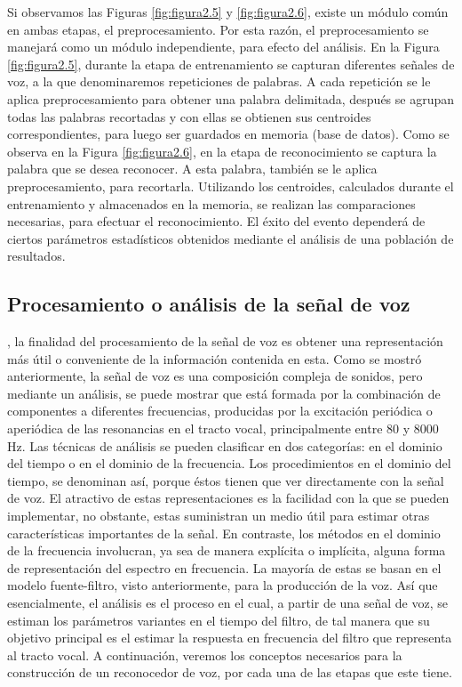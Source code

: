 Si observamos las Figuras \ref{fig:figura2.5} y \ref{fig:figura2.6}, existe un módulo común en ambas etapas, el preprocesamiento. Por esta razón, el preprocesamiento se manejará como un módulo independiente, para efecto del análisis.
\vskip 0.5cm
En la Figura \ref{fig:figura2.5}, durante la etapa de entrenamiento se capturan diferentes señales de voz, a la que denominaremos repeticiones de palabras. A cada repetición se le aplica preprocesamiento para obtener una palabra delimitada, después se agrupan todas las palabras recortadas y con ellas se obtienen sus centroides correspondientes, para luego ser guardados en memoria (base de datos).
\vskip 0.5cm
Como se observa en la Figura \ref{fig:figura2.6}, en la etapa de reconocimiento se captura la palabra que se desea reconocer. A esta palabra, también se le aplica preprocesamiento, para recortarla. Utilizando los centroides, calculados durante el entrenamiento y almacenados en la memoria, se realizan las comparaciones necesarias, para efectuar el reconocimiento. El éxito del evento dependerá de ciertos parámetros estadísticos obtenidos mediante el análisis de una población de resultados.

\subsection{Procesamiento o análisis de la señal de voz}
\cite{rowden}, la finalidad del procesamiento de la señal de voz es obtener una representación más útil o conveniente de la información contenida en esta. Como se mostró anteriormente, la señal de voz es una composición compleja de sonidos, pero mediante un análisis, se puede mostrar que está formada por la combinación de componentes a diferentes frecuencias, producidas por la excitación periódica o aperiódica de las resonancias en el tracto vocal, principalmente entre 80 y 8000 Hz.
\vskip 0.5cm
Las técnicas de análisis se pueden clasificar en dos categorías: en el dominio del tiempo o en el dominio de la frecuencia. Los procedimientos en el dominio del tiempo, se denominan así, porque éstos tienen que ver directamente con la señal de voz. El atractivo de estas representaciones es la facilidad con la que se pueden implementar, no obstante, estas suministran un medio útil para estimar otras características importantes de la señal. En contraste, los métodos en el dominio de la frecuencia involucran, ya sea de manera explícita o implícita, alguna forma de representación del espectro en frecuencia. 
\vskip 0.5cm
La mayoría de estas se basan en el modelo fuente-filtro, visto anteriormente, para la producción de la voz. Así que esencialmente, el análisis es el proceso en el cual, a partir de una señal de voz, se estiman los parámetros variantes en el tiempo del filtro, de tal manera que su objetivo principal es el estimar la respuesta en frecuencia del filtro que representa al tracto vocal. 
\vskip 0.5cm
A continuación, veremos los conceptos necesarios para la construcción de un reconocedor de voz, por cada una de las etapas que este tiene.

